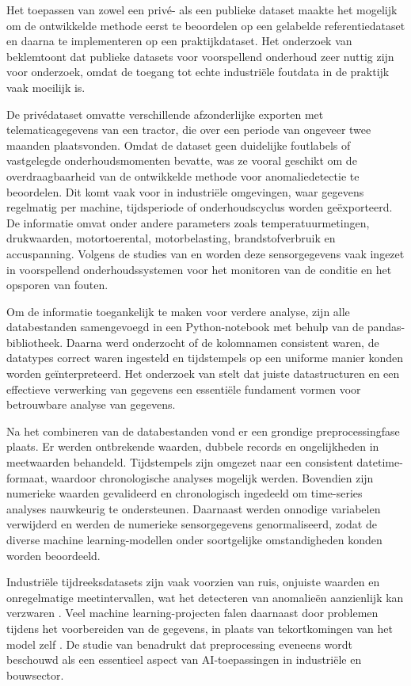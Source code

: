 Het toepassen van zowel een privé- als een publieke dataset maakte het mogelijk om de ontwikkelde methode eerst te beoordelen op een gelabelde referentiedataset en daarna te implementeren op een praktijkdataset. Het onderzoek van \textcite{Veloso2022} beklemtoont dat publieke datasets voor voorspellend onderhoud zeer nuttig zijn voor onderzoek, omdat de toegang tot echte industriële foutdata in de praktijk vaak moeilijk is.
 
De privédataset omvatte verschillende afzonderlijke exporten met telematicagegevens van een tractor, die over een periode van ongeveer twee maanden plaatsvonden. Omdat de dataset geen duidelijke foutlabels of vastgelegde onderhoudsmomenten bevatte, was ze vooral geschikt om de overdraagbaarheid van de ontwikkelde methode voor anomaliedetectie te beoordelen. Dit komt vaak voor in industriële omgevingen, waar gegevens regelmatig per machine, tijdsperiode of onderhoudscyclus worden geëxporteerd. De informatie omvat onder andere parameters zoals temperatuurmetingen, drukwaarden, motortoerental, motorbelasting, brandstofverbruik en accuspanning. Volgens de studies van \textcite{Mahale2025} en \textcite{Touil2025} worden deze sensorgegevens vaak ingezet in voorspellend onderhoudssystemen voor het monitoren van de conditie en het opsporen van fouten.
 
Om de informatie toegankelijk te maken voor verdere analyse, zijn alle databestanden samengevoegd in een Python-notebook met behulp van de pandas-bibliothee\-k. Daarna werd onderzocht of de kolomnamen consistent waren, de datatypes correct waren ingesteld en tijdstempels op een uniforme manier konden worden geïnterpreteerd. Het onderzoek van \textcite{Knuth1998} stelt dat juiste datastructuren en een effectieve verwerking van gegevens een essentiële fundament vormen voor betrouwbare analyse van gegevens.
 
Na het combineren van de databestanden vond er een grondige preprocessingfase plaats. Er werden ontbrekende waarden, dubbele records en ongelijkheden in meetwaarden behandeld. Tijdstempels zijn omgezet naar een consistent datetime-formaat, waardoor chronologische analyses mogelijk werden. Bovendien zijn numerieke waarden gevalideerd en chronologisch ingedeeld om time-series analyses nauwkeurig te ondersteunen. Daarnaast werden onnodige variabelen verwijderd en werden de numerieke sensorgegevens genormaliseerd, zodat de diverse machine learning-modellen onder soortgelijke omstandigheden konden worden beoordeeld.
 
Industriële tijdreeksdatasets zijn vaak voorzien van ruis, onjuiste waarden en onregelmatige meetintervallen, wat het detecteren van anomalieën aanzienlijk kan verzwaren \autocite{Dissem2024}. Veel machine learning-projecten falen daarnaast door problemen tijdens het voorbereiden van de gegevens, in plaats van tekortkomingen van het model zelf \autocite{Carvalho2019}. De studie van \textcite{Elahi2023} benadrukt dat preprocessing eveneens wordt beschouwd als een essentieel aspect van AI-toepassingen in industriële en bouwsector.


